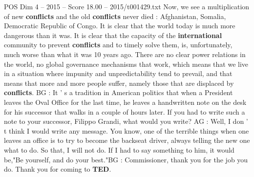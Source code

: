 \begin{textsample}{POS Dim 4 – 2015 – Score 18.00 – 2015/t001429.txt}
Now, we see a multiplication of new \textbf{conflicts} and the old \textbf{conflicts} never died : Afghanistan, Somalia, Democratic Republic of Congo.
It is clear that the world today is much more dangerous than it was.
It is clear that the capacity of the \textbf{international} community to prevent \textbf{conflicts} and to timely solve them, is, unfortunately, much worse than what it was 10 years ago.
There are no clear power relations in the world, no global governance mechanisms that work, which means that we live in a situation where impunity and unpredictability tend to prevail, and that means that more and more people suffer, namely those that are displaced by \textbf{conflicts}.
BG : It ' s a tradition in American politics that when a President leaves the Oval Office for the last time, he leaves a handwritten note on the desk for his successor that walks in a couple of hours later.
If you had to write such a note to your successor, Filippo Grandi, what would you write?
AG : Well, I don ' t think I would write any message.
You know, one of the terrible things when one leaves an office is to try to become the backseat driver, always telling the new one what to do.
So that, I will not do.
If I had to say something to him, it would be,"Be yourself, and do your best."BG : Commissioner, thank you for the job you do.
Thank you for coming to \textbf{TED}.

\end{textsample}
